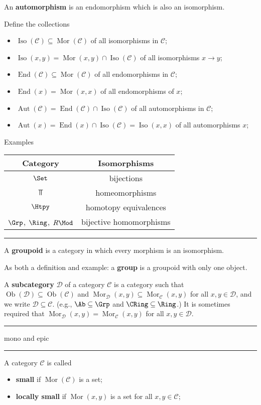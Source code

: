 \documentclass[12pt]{article}
\newcommand{\keyword}[1]{\textbf{#1}}
\newcommand{\sepline}{\rule{\textwidth}{0.4pt}}
\theoremstyle{definition}
\newcommand{\CC}{\mathcal{C}}
\newcommand{\DD}{\mathcal{D}}
\newcommand{\<}{\left\langle}
\renewcommand{\>}{\right\rangle}
\newcommand{\seq}{\subseteq}
\DeclareMathOperator{\Ob}{Ob}
\DeclareMathOperator{\Mor}{Mor}
\DeclareMathOperator{\Iso}{Iso}
\DeclareMathOperator{\End}{End}
\DeclareMathOperator{\Aut}{Aut}
\begin{document}
An \keyword{automorphism} is an endomorphism which is also an isomorphism.

Define the collections
\begin{itemize}
    \item $\Iso(\CC) \seq \Mor(\CC)$ of all isomorphisms in $\CC$;
    \item $\Iso(x, y) = \Mor(x, y) \cap \Iso(\CC)$ of all isomorphisms $x \to y$;
    \item $\End(\CC) \seq \Mor(\CC)$ of all endomorphisms in $\CC$;
    \item $\End(x) = \Mor(x, x)$ of all endomorphisms of $x$;
    \item $\Aut(\CC) = \End(\CC) \cap \Iso(\CC)$ of all automorphisms in $\CC$;
    \item $\Aut(x) = \End(x) \cap \Iso(\CC) = \Iso(x, x)$ of all automorphisms $x$;
\end{itemize}

Examples
\begin{center}
    \begin{tabular}{c|c}
        Category & Isomorphisms \\\hline
        $\Set$ & bijections \\
        $\Top$ & homeomorphisms \\
        $\Htpy$ & homotopy equivalences \\
        $\Grp$, $\Ring$, $R\Mod$ & bijective homomorphisms
    \end{tabular}
\end{center}

\sepline

A \keyword{groupoid} is a category in which every morphism is an isomorphism.

As both a definition and example: a \keyword{group} is a groupoid with only one object.

A \keyword{subcategory} $\DD$ of a category $\CC$ is a category such that $\Ob(\DD) \seq \Ob(\CC)$ and $\Mor_\DD(x, y) \seq \Mor_\CC(x, y)$ for all $x, y \in \DD$, and we write $\DD \seq \CC$.
(e.g., $\Ab \seq \Grp$ and $\CRing \seq \Ring$.)
It is sometimes required that $\Mor_\DD(x, y) = \Mor_\CC(x, y)$ for all $x, y \in \DD$.

\sepline

mono and epic



\sepline

A category $\CC$ is called
\begin{itemize}
    \item \keyword{small} if $\Mor(\CC)$ is a set;
    \item \keyword{locally small} if $\Mor(x, y)$ is a set for all $x, y \in \CC$; 
\end{itemize}
\end{document}
